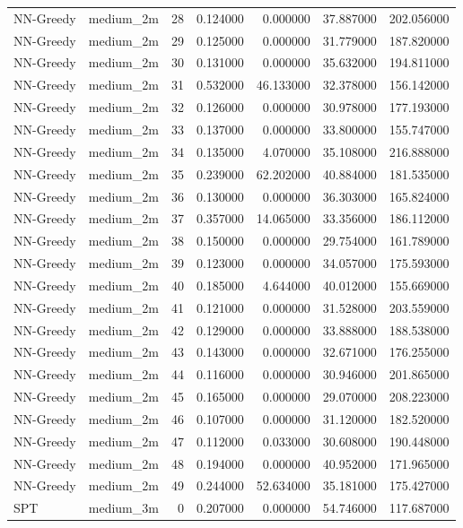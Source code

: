 \begin{tabular}{llrrrrr}
NN-Greedy & medium_2m & 28 & 0.124000 & 0.000000 & 37.887000 & 202.056000 \\
NN-Greedy & medium_2m & 29 & 0.125000 & 0.000000 & 31.779000 & 187.820000 \\
NN-Greedy & medium_2m & 30 & 0.131000 & 0.000000 & 35.632000 & 194.811000 \\
NN-Greedy & medium_2m & 31 & 0.532000 & 46.133000 & 32.378000 & 156.142000 \\
NN-Greedy & medium_2m & 32 & 0.126000 & 0.000000 & 30.978000 & 177.193000 \\
NN-Greedy & medium_2m & 33 & 0.137000 & 0.000000 & 33.800000 & 155.747000 \\
NN-Greedy & medium_2m & 34 & 0.135000 & 4.070000 & 35.108000 & 216.888000 \\
NN-Greedy & medium_2m & 35 & 0.239000 & 62.202000 & 40.884000 & 181.535000 \\
NN-Greedy & medium_2m & 36 & 0.130000 & 0.000000 & 36.303000 & 165.824000 \\
NN-Greedy & medium_2m & 37 & 0.357000 & 14.065000 & 33.356000 & 186.112000 \\
NN-Greedy & medium_2m & 38 & 0.150000 & 0.000000 & 29.754000 & 161.789000 \\
NN-Greedy & medium_2m & 39 & 0.123000 & 0.000000 & 34.057000 & 175.593000 \\
NN-Greedy & medium_2m & 40 & 0.185000 & 4.644000 & 40.012000 & 155.669000 \\
NN-Greedy & medium_2m & 41 & 0.121000 & 0.000000 & 31.528000 & 203.559000 \\
NN-Greedy & medium_2m & 42 & 0.129000 & 0.000000 & 33.888000 & 188.538000 \\
NN-Greedy & medium_2m & 43 & 0.143000 & 0.000000 & 32.671000 & 176.255000 \\
NN-Greedy & medium_2m & 44 & 0.116000 & 0.000000 & 30.946000 & 201.865000 \\
NN-Greedy & medium_2m & 45 & 0.165000 & 0.000000 & 29.070000 & 208.223000 \\
NN-Greedy & medium_2m & 46 & 0.107000 & 0.000000 & 31.120000 & 182.520000 \\
NN-Greedy & medium_2m & 47 & 0.112000 & 0.033000 & 30.608000 & 190.448000 \\
NN-Greedy & medium_2m & 48 & 0.194000 & 0.000000 & 40.952000 & 171.965000 \\
NN-Greedy & medium_2m & 49 & 0.244000 & 52.634000 & 35.181000 & 175.427000 \\
SPT & medium_3m & 0 & 0.207000 & 0.000000 & 54.746000 & 117.687000 \\

\end{tabular}
